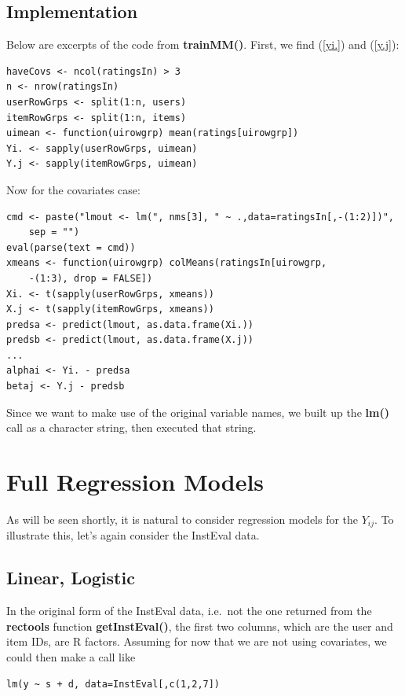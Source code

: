 \subsection{Implementation}

Below are excerpts of the code from \textbf{trainMM()}.  First, we find
(\ref{yi.}) and (\ref{y.j}):

\begin{lstlisting}
haveCovs <- ncol(ratingsIn) > 3
n <- nrow(ratingsIn)
userRowGrps <- split(1:n, users)
itemRowGrps <- split(1:n, items)
uimean <- function(uirowgrp) mean(ratings[uirowgrp])
Yi. <- sapply(userRowGrps, uimean)
Y.j <- sapply(itemRowGrps, uimean)
\end{lstlisting}

Now for the covariates case:

\begin{lstlisting}
cmd <- paste("lmout <- lm(", nms[3], " ~ .,data=ratingsIn[,-(1:2)])",
    sep = "")
eval(parse(text = cmd))
xmeans <- function(uirowgrp) colMeans(ratingsIn[uirowgrp,
    -(1:3), drop = FALSE])
Xi. <- t(sapply(userRowGrps, xmeans))
X.j <- t(sapply(itemRowGrps, xmeans))
predsa <- predict(lmout, as.data.frame(Xi.))
predsb <- predict(lmout, as.data.frame(X.j))
...
alphai <- Yi. - predsa
betaj <- Y.j - predsb
\end{lstlisting}

Since we want to make use of the original variable names, we built up
the \textbf{lm()} call as a character string, then executed that string.

\section{Full Regression Models}

As will be seen shortly, it is natural to consider regression models for
the $Y_{ij}$.  To illustrate this, let's again consider the InstEval
data.

\subsection{Linear, Logistic}
\label{linlog}

In the original form of the InstEval data, i.e.\ not the one returned
from the \textbf{rectools} function \textbf{getInstEval()}, the first
two columns, which are the user and item IDs, are R factors.  Assuming
for now that we are not using covariates, we could
then make a call like

\begin{lstlisting}
lm(y ~ s + d, data=InstEval[,c(1,2,7]) 
\end{lstlisting}

